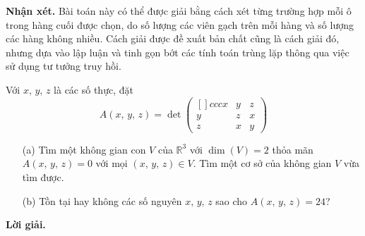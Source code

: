 \textbf{Nhận xét. }Bài toán này có thể được giải bằng cách xét từng trường hợp mỗi ô trong hàng cuối được chọn, do số lượng các viên gạch trên mỗi hàng và số lượng các hàng không nhiều. Cách giải được đề xuất bản chất cũng là cách giải đó, nhưng dựa vào lập luận và tinh gọn bớt các tính toán trùng lặp thông qua việc sử dụng tư tưởng truy hồi. 

\begin{tcolorbox}[title=\textbf{Bài toán B.5 + A.4.},breakable]
    Với $x,\,y,\,z$ là các số thực, đặt 
    $$A(x,\,y,\,z) = \det \begin{pmatrix}[]{ccc}
        x & y & z \\
        y & z & x \\
        z & x & y
    \end{pmatrix}$$
    \begin{enumerate}
        \item[(a)] {Tìm một không gian con $V$ của $\mathbb{R}^3$ với $\dim (V) = 2$ thỏa mãn $A(x,\,y,\,z)=0$ với mọi $(x,\,y,\,z) \in V$. Tìm một cơ sở của không gian $V$ vừa tìm được.}
        \item[(b)] {Tồn tại hay không các số nguyên $x,\,y,\,z$ sao cho $A(x,\,y,\,z) = 24$?}
    \end{enumerate}
\end{tcolorbox}

\textbf{Lời giải. }

